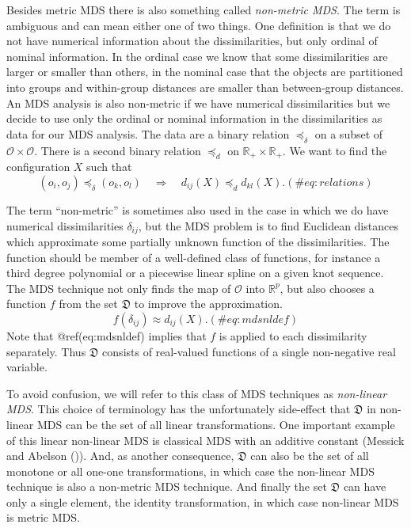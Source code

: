 \documentclass[
  12pt,
  letterpaper,
  DIV=11,
  numbers=noendperiod]{scrartcl}
\begin{document}
Besides metric MDS there is also something called \emph{non-metric MDS}.
The term is ambiguous and can mean either one of two things. One
definition is that we do not have numerical information about the
dissimilarities, but only ordinal of nominal information. In the ordinal
case we know that some dissimilarities are larger or smaller than
others, in the nominal case that the objects are partitioned into groups
and within-group distances are smaller than between-group distances. An
MDS analysis is also non-metric if we have numerical dissimilarities but
we decide to use only the ordinal or nominal information in the
dissimilarities as data for our MDS analysis. The data are a binary
relation \(\preceq_\delta\) on a subset of
\(\mathcal{O}\times\mathcal{O}\). There is a second binary relation
\(\preceq_d\) on \(\mathbb{R}_+\times\mathbb{R}_+\). We want to find the
configuration \(X\) such that \begin{equation}
(o_i,o_j)\preceq_\delta(o_k,o_l)\quad\Rightarrow\quad d_{ij}(X)\preceq_d d_{kl}(X).
(\#eq:relations)
\end{equation}

The term ``non-metric'' is sometimes also used in the case in which we
do have numerical dissimilarities \(\delta_{ij}\), but the MDS problem
is to find Euclidean distances which approximate some partially unknown
function of the dissimilarities. The function should be member of a
well-defined class of functions, for instance a third degree polynomial
or a piecewise linear spline on a given knot sequence. The MDS technique
not only finds the map of \(\mathcal{O}\) into \(\mathbb{R}^p\), but
also chooses a function \(f\) from the set \(\mathfrak{D}\) to improve
the approximation. \begin{equation}
f(\delta_{ij})\approx d_{ij}(X).
(\#eq:mdsnldef)
\end{equation} Note that @ref(eq:mdsnldef) implies that \(f\) is applied
to each dissimilarity separately. Thus \(\mathfrak{D}\) consists of
real-valued functions of a single non-negative real variable.

To avoid confusion, we will refer to this class of MDS techniques as
\emph{non-linear MDS}. This choice of terminology has the unfortunately
side-effect that \(\mathfrak{D}\) in non-linear MDS can be the set of
all linear transformations. One important example of this linear
non-linear MDS is classical MDS with an additive constant (Messick and
Abelson ()). And, as another
consequence, \(\mathfrak{D}\) can also be the set of all monotone or all
one-one transformations, in which case the non-linear MDS technique is
also a non-metric MDS technique. And finally the set \(\mathfrak{D}\)
can have only a single element, the identity transformation, in which
case non-linear MDS is metric MDS.
\end{document}
